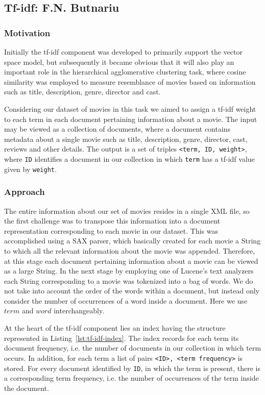\subsection{Tf-idf: F.N. Butnariu}
\subsubsection{Motivation}
Initially the tf-idf component was developed to primarily support the vector space model, but subsequently it became obvious that it will also play an important role in the hierarchical agglomerative clustering task, where cosine similarity was employed to measure resemblance of movies based on information such as title, description, genre, director and cast.

Considering our dataset of movies in this task we aimed to assign a tf-idf weight to each term in each document pertaining information about a movie. The input may be viewed as a collection of documents, where a document contains metadata about a single movie such as title, description, genre, director, cast, reviews and other details. The output is a set of triples \verb+<term, ID, weight>+, where \verb+ID+ identifies a document in our collection in which \verb+term+ has a tf-idf value given by \verb+weight+.

\subsubsection{Approach}

The entire information about our set of movies resides in a single XML file, so the first challenge was to transpose this information into a document representation corresponding to each movie in our dataset. This was accomplished using a SAX parser, which basically created for each movie a String to which all the relevant information about the movie was appended. Therefore, at this stage each document pertaining information about a movie can be viewed as a large String. In the next stage by employing one of Lucene's text analyzers each String corresponding to a movie was tokenized into a bag of words. We do not take into account the order of the words within a document, but instead only consider the number of occurrences of a word inside a document. Here we use $term$ and $word$ interchangeably.

At the heart of the tf-idf component lies an index having the structure represented in Listing~\ref{lst:tf-idf-index}. The index records for each term its document frequency, i.e. the number of documents in our collection in which term occurs. In addition, for each term a list of pairs \verb+<ID>, <term frequency>+ is stored. For every document identified by \verb+ID+, in which the term is present, there is a corresponding term frequency, i.e. the number of occurrences of the term inside the document.

